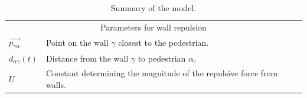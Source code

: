\begin{table}[h]
\begin{tabular}{l l}
        \midrule
        \multicolumn{2}{c}{\textsf{Parameters for wall repulsion}}\\
        $\overrightarrow{p_{\gamma \alpha}}$ & Point on the wall $\gamma$ closest to 
        the pedestrian.\\
        $d_{\alpha \gamma}(t)$ & Distance from the wall $\gamma$ to pedestrian 
        $\alpha$. \\
        $U$ & Constant determining the magnitude of the repulsive force from 
        walls. \\
        \bottomrule
    \end{tabular}
    \caption{Summary of the model.}
    \label{tbl:model-summary}
\end{table}

